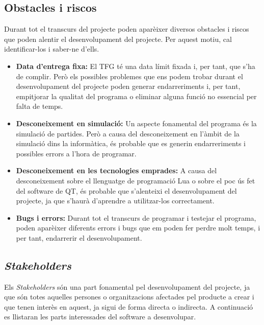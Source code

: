 \documentclass[a4paper]{article}
\begin{document}
\subsection{Obstacles i riscos}
Durant tot el transcurs del projecte poden aparèixer diversos obstacles i riscos que poden alentir el desenvolupament del projecte. Per aquest motiu, cal identificar-los i saber-ne d'ells.

\begin{itemize}
    \item \textbf{Data d'entrega fixa:} El TFG té una data límit fixada i, per tant, que s'ha de complir. Però els possibles problemes que ens podem trobar durant el desenvolupament del projecte poden generar endarreriments i, per tant, empitjorar la qualitat del programa o eliminar alguna funció no essencial per falta de temps.
    \item \textbf{Desconeixement en simulació:} Un aspecte fonamental del programa és la simulació de partides. Però a causa del desconeixement en l'àmbit de la simulació dins la informàtica, és probable que es generin endarreriments i possibles errors a l'hora de programar.
    \item \textbf{Desconeixement en les tecnologies emprades:} A causa del desconeixement sobre el llenguatge de programació Lua o sobre el poc ús fet del software de QT, és probable que s'alenteixi el desenvolupament del projecte, ja que s'haurà d'aprendre a utilitzar-los correctament.
    \item \textbf{Bugs i errors:} Durant tot el transcurs de programar i testejar el programa, poden aparèixer diferents errors i bugs que em poden fer perdre molt temps, i per tant, endarrerir el desenvolupament.
\end{itemize}

\subsection{\textit{Stakeholders}}
Els \textit{Stakeholders} són una part fonamental pel desenvolupament del projecte, ja que són totes aquelles persones o organitzacions afectades pel producte a crear i que tenen interès en aquest, ja sigui de forma directa o indirecta. A continuació es llistaran les parts interessades del software a desenvolupar.
\end{document}
